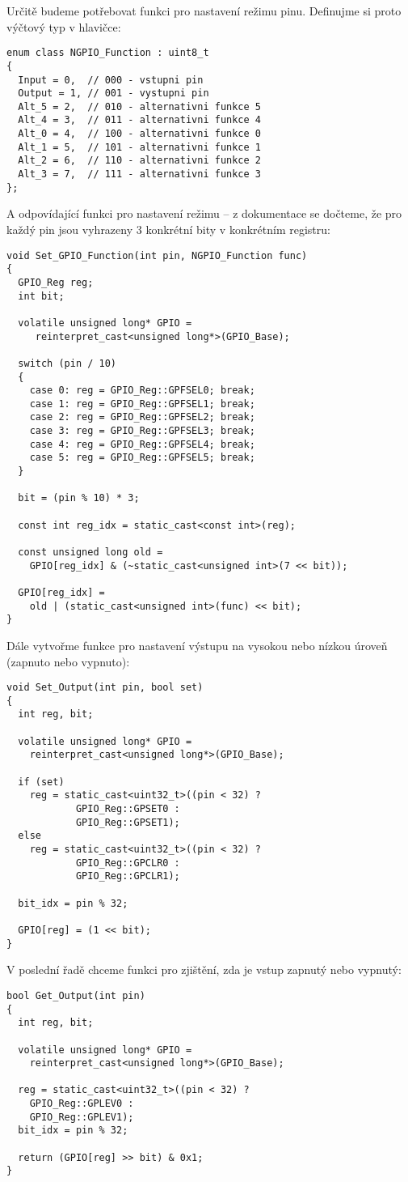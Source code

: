 \documentclass{article}
\begin{document}
Určitě budeme potřebovat funkci pro nastavení režimu pinu. Definujme si proto výčtový typ v hlavičce:
\begin{lstlisting}
enum class NGPIO_Function : uint8_t
{
  Input = 0,  // 000 - vstupni pin
  Output = 1, // 001 - vystupni pin
  Alt_5 = 2,  // 010 - alternativni funkce 5
  Alt_4 = 3,  // 011 - alternativni funkce 4
  Alt_0 = 4,  // 100 - alternativni funkce 0
  Alt_1 = 5,  // 101 - alternativni funkce 1
  Alt_2 = 6,  // 110 - alternativni funkce 2
  Alt_3 = 7,  // 111 - alternativni funkce 3
};
\end{lstlisting}
A odpovídající funkci pro nastavení režimu -- z dokumentace se dočteme, že pro každý pin jsou vyhrazeny 3 konkrétní bity v konkrétním registru:
\begin{lstlisting}
void Set_GPIO_Function(int pin, NGPIO_Function func)
{
  GPIO_Reg reg;
  int bit;
  
  volatile unsigned long* GPIO =
     reinterpret_cast<unsigned long*>(GPIO_Base);
	
  switch (pin / 10)
  {
    case 0: reg = GPIO_Reg::GPFSEL0; break;
    case 1: reg = GPIO_Reg::GPFSEL1; break;
    case 2: reg = GPIO_Reg::GPFSEL2; break;
    case 3: reg = GPIO_Reg::GPFSEL3; break;
    case 4: reg = GPIO_Reg::GPFSEL4; break;
    case 5: reg = GPIO_Reg::GPFSEL5; break;
  }
	
  bit = (pin % 10) * 3;
  
  const int reg_idx = static_cast<const int>(reg);
  
  const unsigned long old =
    GPIO[reg_idx] & (~static_cast<unsigned int>(7 << bit));

  GPIO[reg_idx] =
    old | (static_cast<unsigned int>(func) << bit);
}
\end{lstlisting}
Dále vytvořme funkce pro nastavení výstupu na vysokou nebo nízkou úroveň (zapnuto nebo vypnuto):
\begin{lstlisting}
void Set_Output(int pin, bool set)
{
  int reg, bit;
  
  volatile unsigned long* GPIO =
    reinterpret_cast<unsigned long*>(GPIO_Base);
    
  if (set)
  	reg = static_cast<uint32_t>((pin < 32) ?
  	        GPIO_Reg::GPSET0 :
  	        GPIO_Reg::GPSET1);
  else
  	reg = static_cast<uint32_t>((pin < 32) ?
  	        GPIO_Reg::GPCLR0 :
  	        GPIO_Reg::GPCLR1);

  bit_idx = pin % 32;
	
  GPIO[reg] = (1 << bit);
}
\end{lstlisting}
V poslední řadě chceme funkci pro zjištění, zda je vstup zapnutý nebo vypnutý:
\begin{lstlisting}
bool Get_Output(int pin)
{
  int reg, bit;
	
  volatile unsigned long* GPIO =
    reinterpret_cast<unsigned long*>(GPIO_Base);
	
  reg = static_cast<uint32_t>((pin < 32) ?
    GPIO_Reg::GPLEV0 :
    GPIO_Reg::GPLEV1);
  bit_idx = pin % 32;
	
  return (GPIO[reg] >> bit) & 0x1;
}
\end{lstlisting}
\end{document}
